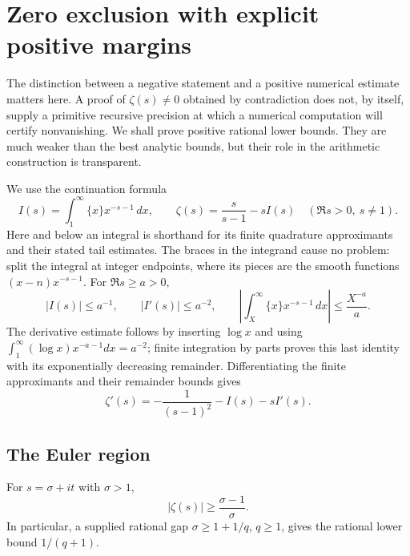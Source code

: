 \section{Zero exclusion with explicit positive margins}
\label{sec:elementary-zero-exclusion}

The distinction between a negative statement and a positive numerical
estimate matters here.  A proof of $\zeta(s)\ne0$ obtained by contradiction
does not, by itself, supply a primitive recursive precision at which a
numerical computation will certify nonvanishing.  We shall prove positive
rational lower bounds.  They are much weaker than the best analytic
bounds, but their role in the arithmetic construction is transparent.

We use the continuation formula
\begin{equation}
 I(s)=\int_1^\infty\{x\}x^{-s-1}\,dx,
 \qquad \zeta(s)=\frac{s}{s-1}-sI(s)
 \quad(\Re s>0,\ s\ne1).
 \label{eq:elem-euler-integral}
\end{equation}
Here and below an integral is shorthand for its finite quadrature
approximants and their stated tail estimates.  The braces in the
integrand cause no problem: split the integral at integer endpoints,
where its pieces are the smooth functions $(x-n)x^{-s-1}$.
For $\Re s\ge a>0$,
\begin{equation}
 |I(s)|\le a^{-1},\qquad |I'(s)|\le a^{-2},\qquad
 \left|\int_X^\infty\{x\}x^{-s-1}\,dx\right|
 \le \frac{X^{-a}}a .
 \label{eq:elem-I-bounds}
\end{equation}
The derivative estimate follows by inserting $\log x$ and using
$\int_1^\infty (\log x)x^{-a-1}dx=a^{-2}$; finite integration by parts
proves this last identity with its exponentially decreasing remainder.
Differentiating the finite approximants and their remainder bounds gives
\begin{equation}
 \zeta'(s)=-\frac1{(s-1)^2}-I(s)-sI'(s).
 \label{eq:elem-zeta-derivative}
\end{equation}

\subsection{The Euler region}

\begin{theorem}
\label{thm:elem-euler}
For $s=\sigma+it$ with $\sigma>1$,
\begin{equation}
 |\zeta(s)|\ge\frac{\sigma-1}{\sigma}.
 \label{eq:elem-euler-apartness}
\end{equation}
In particular, a supplied rational gap $\sigma\ge1+1/q$, $q\ge1$,
gives the rational lower bound $1/(q+1)$.
\end{theorem}

